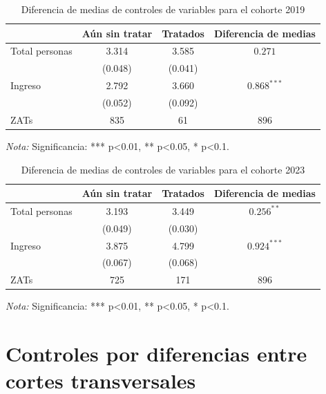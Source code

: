 \documentclass{article}
\begin{document}
\begin{table} [H]
  \centering
  \caption{Diferencia de medias de controles de variables para el cohorte 2019}
  \label{tab:balance_2019}
  \begin{tabular}{l c c c}
    \toprule
    & \textbf{Aún sin tratar} & \textbf{Tratados} & \textbf{Diferencia de medias} \\
    \midrule
    Total personas & 3.314 & 3.585 & $0.271$ \\
    & (0.048) & (0.041) & \\
    Ingreso & 2.792 & 3.660 & $0.868^{***}$ \\
    & (0.052) & (0.092) & \\
    \midrule
    ZATs & 835 & 61 & 896 \\
    \bottomrule
  \end{tabular}
\parbox[t]{\textwidth}{%
    \vspace{0.5em}
    \footnotesize{ \textit{Nota:} Significancia: *** p<0.01, ** p<0.05, * p<0.1.}}
  \end{table}

\begin{table} [H]
  \centering
  \caption{Diferencia de medias de controles de variables para el cohorte 2023}
  \label{tab:balance_2023}
  \begin{tabular}{l c c c}
    \toprule
    & \textbf{Aún sin tratar} & \textbf{Tratados} & \textbf{Diferencia de medias} \\
    \midrule
    Total personas & 3.193 & 3.449 & $0.256^{**}$ \\
    & (0.049) & (0.030) & \\
    Ingreso & 3.875 & 4.799 & $0.924^{***}$ \\
    & (0.067) & (0.068) & \\
    \midrule
    ZATs & 725 & 171 & 896 \\
    \bottomrule
  \end{tabular}
  \parbox[t]{\textwidth}{%
    \vspace{0.5em}
    \footnotesize{ \textit{Nota:} Significancia: *** p<0.01, ** p<0.05, * p<0.1.}}
  \vspace{0.2cm}
  \end{table}

\section{Controles por diferencias entre cortes transversales}
\label{sec:controles_cortes_transversales}
\end{document}
